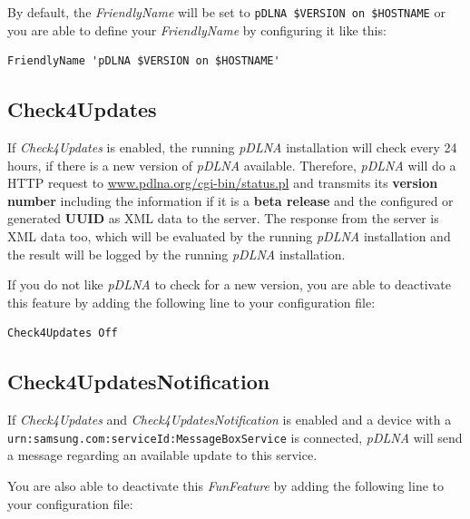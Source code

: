 \documentclass[a4paper,oneside,10pt]{report}
\newenvironment{colframefile}{%
  \begin{Sbox}
    \begin{minipage}{.99\columnwidth}
}{%
  \end{minipage}
  \end{Sbox}
  \begin{center}
    \fcolorbox{black}{Yellow}{\TheSbox}
  \end{center}
}
\begin{document}
By default, the {\em FriendlyName} will be set to \verb|pDLNA $VERSION on $HOSTNAME| or you are able to define your {\em FriendlyName} by configuring it like this:

\begin{colframefile}
\begin{verbatim}
FriendlyName 'pDLNA $VERSION on $HOSTNAME'
\end{verbatim}
\end{colframefile}

\subsection{Check4Updates}
\label{config-check4updates}

If {\em Check4Updates} is enabled, the running {\em pDLNA} installation will check every 24 hours, if there is a new version of {\em pDLNA} available. Therefore, {\em pDLNA} will do a HTTP request to \url{www.pdlna.org/cgi-bin/status.pl} and transmits its \textbf{version number} including the information if it is a \textbf{beta release} and the configured or generated \textbf{UUID} as XML data to the server. The response from the server is XML data too, which will be evaluated by the running {\em pDLNA} installation and the result will be logged by the running {\em pDLNA} installation.

If you do not like {\em pDLNA} to check for a new version, you are able to deactivate this feature by adding the following line to your configuration file:

\begin{colframefile}
\begin{verbatim}
Check4Updates Off
\end{verbatim}
\end{colframefile}

\subsection{Check4UpdatesNotification}
\label{config-check4updatesnotification}

If {\em Check4Updates} and {\em Check4UpdatesNotification} is enabled and a device with a \verb|urn:samsung.com:serviceId:MessageBoxService| is connected, {\em pDLNA} will send a message regarding an available update to this service.

You are also able to deactivate this {\em FunFeature} by adding  the following line to your configuration file:
\end{document}
